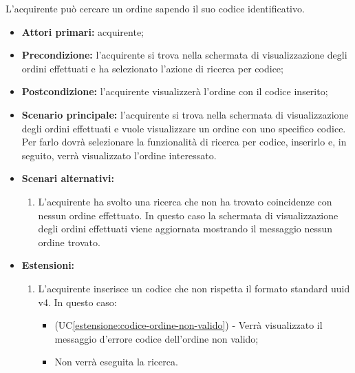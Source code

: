 
\label{ricerca-codice-ordine-acquirente}

L'acquirente può cercare un ordine sapendo il suo codice identificativo.
\begin{itemize}
    \item \textbf{Attori primari:} acquirente;
    \item \textbf{Precondizione:} l'acquirente si trova nella schermata di visualizzazione degli ordini effettuati e ha selezionato l'azione di ricerca per codice;
    \item \textbf{Postcondizione:} l'acquirente visualizzerà l'ordine con il codice inserito;
    \item \textbf{Scenario principale:} l'acquirente si trova nella schermata di visualizzazione degli ordini effettuati e vuole visualizzare un ordine con uno specifico codice. Per farlo dovrà selezionare la funzionalità di ricerca per codice, inserirlo e, in seguito, verrà visualizzato l'ordine interessato.
    \item \textbf{Scenari alternativi:}
    \begin{enumerate}[label=\lett]
    	\item L'acquirente ha svolto una ricerca che non ha trovato coincidenze con nessun ordine effettuato. In questo caso la schermata di visualizzazione degli ordini effettuati viene aggiornata mostrando il messaggio nessun ordine trovato.
    \end{enumerate}
    \item \textbf{Estensioni:}
    \begin{enumerate}[label=\lett]
        \item L'acquirente inserisce un codice che non rispetta il formato standard uuid v4. In questo caso:
        \begin{itemize}
            \item (UC\ref{estensione:codice-ordine-non-valido}) - Verrà visualizzato il messaggio d'errore codice dell'ordine non valido;
            \item Non verrà eseguita la ricerca.
        \end{itemize}
    \end{enumerate}
\end{itemize}


